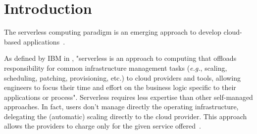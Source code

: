 \section{Introduction}
The serverless computing paradigm is an emerging approach to develop cloud-based applications~\cite{Baldini2017, riseofserverless, vanEyk:2017:SCG:3154847.3154848}.

As defined by \gls{IBM} in \cite{serverlessibm}, "serverless is an approach to computing that offloads responsibility for common infrastructure management tasks (\emph{e.g.}, scaling, scheduling, patching, provisioning, etc.) to cloud providers and tools, allowing engineers to focus their time and effort on the business logic specific to their applications or process".
Serverless requires less expertise than other self-managed approaches.
In fact, users don't manage directly the operating infrastructure, delegating the (automatic) scaling directly to the cloud provider.
This approach allows the providers to charge only for the given service offered~\cite{serverlessaws, serverlessazure}.

